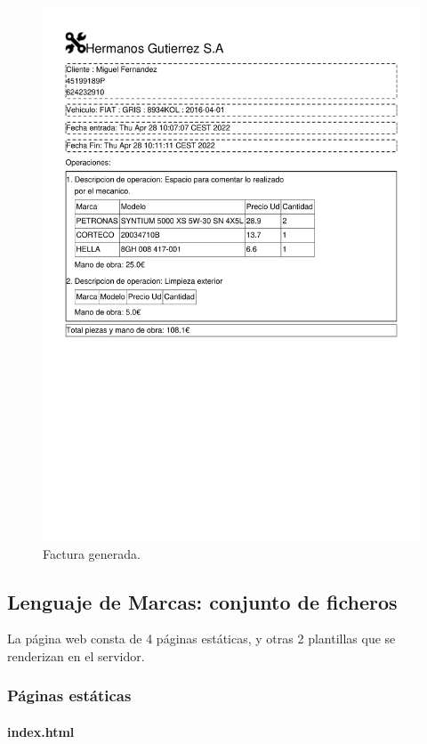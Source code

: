 \documentclass{article}
\begin{document}
  \begin{figure}[H]
    \centering
    \includegraphics[width=1.0\textwidth]{program/capturasEjec/Factura 6.pdf}
    \caption{Factura generada.}
  \end{figure}

\subsection{Lenguaje de Marcas: conjunto de ficheros}
La página web consta de 4 páginas estáticas, y otras 2 plantillas que se renderizan en el servidor.\\
\subsubsection{Páginas estáticas}
\paragraph{index.html}
\end{document}
